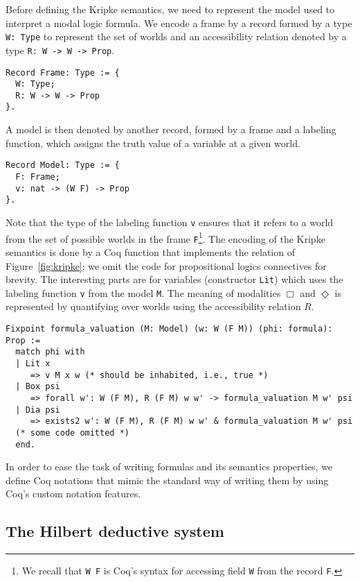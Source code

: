 \documentclass[3p,times]{elsarticle}
\begin{document}
Before defining the Kripke semantics, we need to represent the model used to
interpret a modal logic formula. We encode a frame by a record formed by
a type \texttt{W: Type} to represent the set of worlds and an
accessibility relation denoted by a type \texttt{R: W -> W -> Prop}.
\begin{verbatim}
Record Frame: Type := {
  W: Type;
  R: W -> W -> Prop
}.
\end{verbatim}
A model is then denoted by another record, formed by a frame and a labeling function,
which assigns the truth value of a variable at a given world.
\begin{verbatim}
Record Model: Type := {
  F: Frame;
  v: nat -> (W F) -> Prop
}.
\end{verbatim}
Note that the type of the labeling function \texttt{v} ensures that it
refers to a world from the set of possible worlds in the frame
\texttt{F}\footnote{We recall that \texttt{W F} is Coq's syntax for
accessing field \texttt{W} from the record \texttt{F}.}. The encoding of the Kripke semantics is done by a Coq function
that implements the relation of Figure~\ref{fig:kripke}; we omit the code
for propositional logics connectives for brevity. The interesting parts are for
variables (constructor \texttt{Lit}) which uses the labeling function
\texttt{v} from the model \texttt{M}. The meaning of
modalities $\Box$ and $\Diamond$ is represented by quantifying over worlds
using the accessibility relation $R$.
\begin{verbatim}
Fixpoint formula_valuation (M: Model) (w: W (F M)) (phi: formula): Prop :=
  match phi with
  | Lit x
     => v M x w (* should be inhabited, i.e., true *)
  | Box psi
     => forall w': W (F M), R (F M) w w' -> formula_valuation M w' psi
  | Dia psi
     => exists2 w': W (F M), R (F M) w w' & formula_valuation M w' psi
  (* some code omitted *)
  end.
\end{verbatim}
In order to ease the task of writing formulas and its semantics properties, we
define Coq notations that mimic the standard way of writing them
by using Coq's custom notation features.

\subsection{The Hilbert deductive system}
\end{document}
